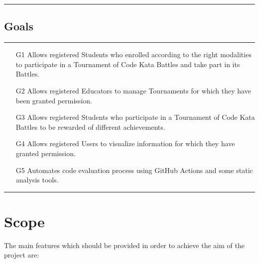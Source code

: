 \documentclass{Configuration_Files/Template}
\begin{document}
{\color{bluepoli}\rule{\linewidth}{0.1pt}}

\subsection{Goals}

{\color{bluepoli}\rule{\linewidth}{0.1pt}}

\begin{enumerate}
    \item[\textcolor{bluepoli}{G1}] Allows registered Students who enrolled according to the right modalities to participate in a Tournament of Code Kata Battles and take part in its Battles.
    \item[\textcolor{bluepoli}{G2}] Allows registered Educators to manage Tournaments for which they have been granted permission.
    \item[\textcolor{bluepoli}{G3}] Allows registered Students who participate in a Tournament of Code Kata Battles to be rewarded of different achievements.
    \item[\textcolor{bluepoli}{G4}] Allows registered Users to visualize information for which they have granted permission.
    \item[\textcolor{bluepoli}{G5}] Automates code evaluation process using GitHub Actions and some static analysis tools.
\end{enumerate}

{\color{bluepoli}\rule{\linewidth}{0.1pt}}

\section{Scope}

The main features which should be provided in order to achieve the aim of the project are:
\end{document}
